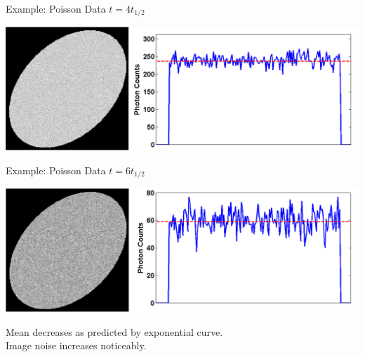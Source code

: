 \begin{frame}{Example: Poisson Data $t = 4t_{1/2}$}
    \begin{centering}
        \includegraphics[width=1\textwidth]{images/poisC}\\
    \end{centering}

\end{frame}

\begin{frame}{Example: Poisson Data $t = 6t_{1/2}$}
    \begin{centering}
        \includegraphics[width=1\textwidth]{images/poisD}\\
    \end{centering}
    Mean decreases as predicted by exponential curve. \\[0.25cm]
    Image noise increases noticeably.
\end{frame}




